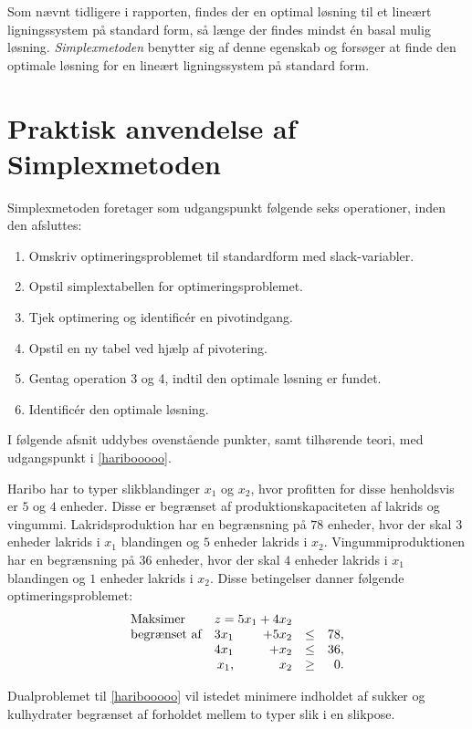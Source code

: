 Som nævnt tidligere i rapporten, findes der en optimal løsning til et lineært ligningssystem på standard form, så længe der findes mindst én basal mulig løsning. 
\textit{Simplexmetoden} benytter sig af denne egenskab og forsøger at finde den optimale løsning for en lineært ligningssystem på standard form.
%
%
\section{Praktisk anvendelse af Simplexmetoden}
Simplexmetoden foretager som udgangspunkt følgende seks operationer, inden den afsluttes: 
%
\begin{col}{}{}
%
\begin{enumerate}
\item Omskriv optimeringsproblemet til standardform med slack-variabler.  %
\item Opstil simplextabellen for optimeringsproblemet.					 %
\item Tjek optimering og identificér en pivotindgang.					 %
\item Opstil en ny tabel ved hjælp af pivotering. 						 %
\item Gentag operation 3 og 4, indtil den optimale løsning er fundet. 					 %
\item Identificér den optimale løsning.									 %
\end{enumerate}
%
\end{col}
\noindent
%
I følgende afsnit uddybes ovenstående punkter, samt tilhørende teori, med udgangspunkt i \ref{haribooooo}.
%
\\
%
\begin{eks}
\label{haribooooo}
Haribo har to typer slikblandinger $x_1$ og $x_2$, hvor profitten for disse henholdsvis er $5$ og $4$ enheder.
Disse er begrænset af produktionskapaciteten af lakrids og vingummi.
Lakridsproduktion har en begrænsning på $78$ enheder, hvor der skal $3$ enheder lakrids i $x_1$ blandingen og $5$ enheder lakrids i $x_2$.
Vingummiproduktionen har en begrænsning på $36$ enheder, hvor der skal $4$ enheder lakrids i $x_1$ blandingen og $1$ enheder lakrids i $x_2$. 
%
Disse betingelser danner følgende optimeringsproblemet:
%
\begin{align*}
\begin{array}{lrrlr} 
\text{Maksimer}		&	\multicolumn{2}{c}{z=5x_1+4x_2}  &\\
\text{begrænset af}	&3x_1& +5x_2			&\leq 	&78,\\
					&4x_1& + x_2				&\leq	& 36,\\
					&x_1,& x_2				&\geq	& 0.
\end{array}
\end{align*}
%
\end{eks}
% 
Dualproblemet til \ref{haribooooo} vil istedet minimere indholdet af sukker og kulhydrater begrænset af forholdet mellem to typer slik i en slikpose.
%
